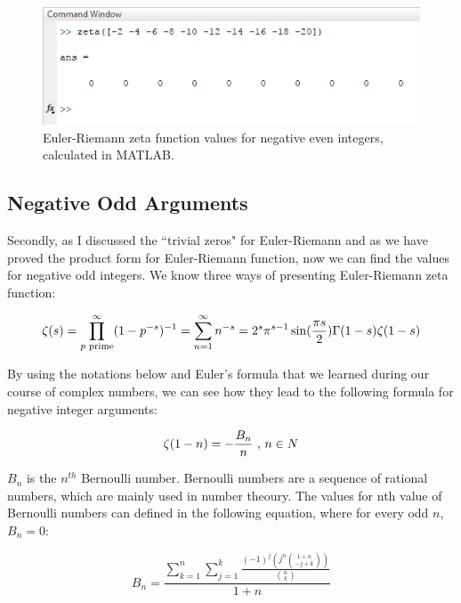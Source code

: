 \documentclass[a4paper]{article}
\begin{document}
\begin{figure}[h!]
  \includegraphics[width=\textwidth]{zerosv.png}
\begin{center}
  \caption{Euler-Riemann zeta
function values for
negative even integers,
calculated in MATLAB.}
  \label{fig:zerosv}
\end{center}
\end{figure}

\subsection{Negative Odd Arguments}

Secondly, as I discussed the “trivial zeros" for Euler-Riemann and as we have proved the product
form for Euler-Riemann function, now we can find the values for negative odd integers. We know
three ways of presenting Euler-Riemann zeta function:

\begin{equation}
  \zeta(s)=\prod_{p \text{ prime}}^{\infty} (1-p^{-s})^{-1}=\sum_{n=1}^{\infty} n^{-s}=2^s\pi^{s-1}\sin(\frac{\pi s}{2})\Gamma(1-s)\zeta(1-s)\\
  \end{equation}

By using the notations below and Euler's formula that we learned during our course of complex
numbers, we can see how they lead\cite{Bern} to the following formula
for negative integer arguments:

\begin{equation}
  \label{bnn}
  \zeta(1-n)=-\frac{B_n}{n} \text{ , $n\in N$}\\
  \end{equation}

$B_n$ is the $n^{th}$ Bernoulli number. Bernoulli numbers are a sequence of rational numbers, which are
mainly used in number theoury. The values for nth value of Bernoulli numbers can defined in the
following equation\cite{BernSeq}, where for
every odd $n$, $B_n=0$:

\begin{equation*}
  B_n=\frac{\sum_{k=1}^{n} \sum_{j=1}^{k} \frac{(-1)^j (j^n \binom{1+n}{-j+k}) }{\binom{n}{k}} }{1+n}
  \end{equation*}
\end{document}
